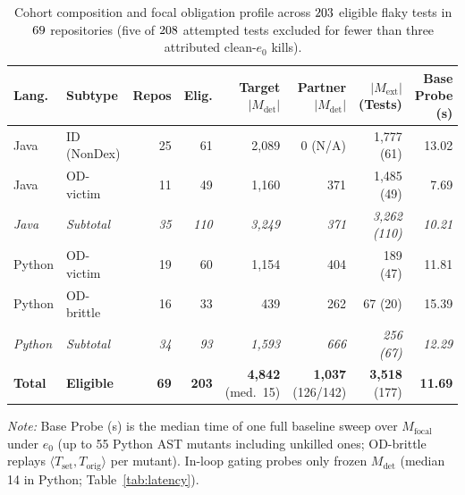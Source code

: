 \begin{table}[t]
\centering
\scriptsize
\setlength{\tabcolsep}{3.6pt}
\caption{Cohort composition and focal obligation profile across $203$ eligible flaky tests in $69$ repositories (five of $208$ attempted tests excluded for fewer than three attributed clean-$e_0$ kills).}
\label{tab:benchmark}
\begin{tabular}{llrrrrrr}
\toprule
Lang. & Subtype & Repos & Elig. & Target $|M_{\text{det}}|$ & Partner $|M_{\text{det}}|$ & $|M_{\text{ext}}|$ (Tests) & Base Probe (s) \\
\midrule
Java & ID (NonDex) & 25 & 61 & 2,089 & 0 (N/A) & 1,777 (61) & 13.02 \\
Java & OD-victim & 11 & 49 & 1,160 & 371 & 1,485 (49) & 7.69 \\
\textit{Java} & \textit{Subtotal} & \textit{35} & \textit{110} & \textit{3,249} & \textit{371} & \textit{3,262 (110)} & \textit{10.21} \\
\midrule
Python & OD-victim & 19 & 60 & 1,154 & 404 & 189 (47) & 11.81 \\
Python & OD-brittle & 16 & 33 & 439 & 262 & 67 (20) & 15.39 \\
\textit{Python} & \textit{Subtotal} & \textit{34} & \textit{93} & \textit{1,593} & \textit{666} & \textit{256 (67)} & \textit{12.29} \\
\midrule
\textbf{Total} & \textbf{Eligible} & \textbf{69} & \textbf{203} & \textbf{4,842} (med.\ 15) & \textbf{1,037} (126/142) & \textbf{3,518} (177) & \textbf{11.69} \\
\bottomrule
\end{tabular}
\par\smallskip\parbox{0.96\textwidth}{\scriptsize\textit{Note:} Base Probe (s) is the median time of one full baseline sweep over $M_{\text{focal}}$ under $e_0$ (up to 55 Python AST mutants including unkilled ones; OD-brittle replays $\langle T_{\text{set}}, T_{\text{orig}} \rangle$ per mutant). In-loop gating probes only frozen $M_{\text{det}}$ (median 14 in Python; Table~\ref{tab:latency}).}
\end{table}
